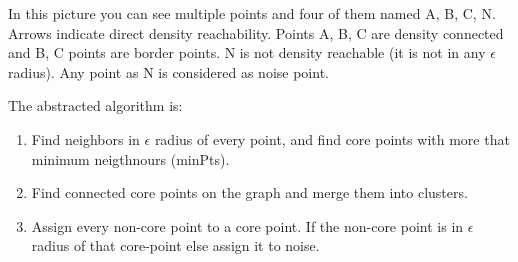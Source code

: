 	In this picture you can see multiple points and four of them named A, B, C, N.
	Arrows indicate direct density reachability. Points A, B, C are density connected and B, C points are border points.
	N is not density reachable (it is not in any $\epsilon$ radius). Any point as N is considered as noise point.

	The abstracted algorithm is:\nopagebreak
	\begin{enumerate}
			\item Find neighbors in $\epsilon$ radius of every point, and find core
			points with more that minimum neigthnours (minPts).
			\item Find connected core points on the graph and merge them into clusters.
			\item Assign every non-core point to a core point. If the non-core point
			is in $\epsilon$ radius of that core-point else assign it to noise.
	\end{enumerate}

